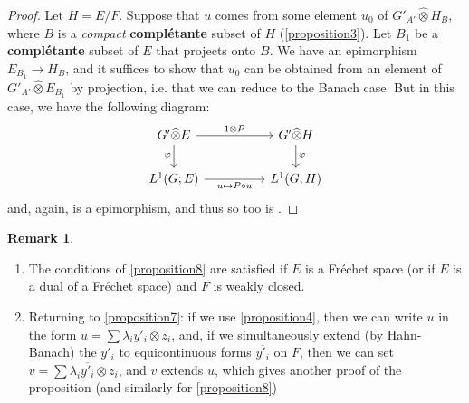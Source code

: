 \documentclass{article}
\theoremstyle{plain}
\theoremstyle{definition}
\newtheorem*{remark}{Remark}
\newcommand{\cotimes}{\widehat{\otimes}}
\newcommand{\oldpage}[1]{\marginpar{\footnotesize$\Big\vert$ \textit{p.~#1}}}
\begin{document}
\begin{proof}
  Let $H=E/F$.
  Suppose that $u$ comes from some element $u_0$ of $G'_{A'}\cotimes H_B$, where $B$ is a \emph{compact} \textbf{complétante} subset of $H$ (\cref{proposition3}).
  Let $B_1$ be a \textbf{complétante} subset of $E$ that projects onto $B$.
  We have an epimorphism $E_{B_1}\to H_B$, and it suffices to show that $u_0$ can be obtained from an element of $G'_{A'}\cotimes E_{B_1}$ by projection, i.e. that we can reduce to the Banach case.
  But in this case, we have the following diagram:
  \[
    \begin{tikzcd}[column sep=huge]
      G'\cotimes E \ar[r,"1\otimes P"] \ar[d,swap,"\varphi"]
      & G'\cotimes H \ar[d,"\varphi"]
    \\L^1(G;E) \ar[r,swap,"u\mapsto P\circ u"]
      & L^1(G;H)
    \end{tikzcd}
  \]
  and, again,  is a epimorphism, and thus so too is .
\end{proof}

\begin{remark}
  \begin{enumerate}
    \item The conditions of \cref{proposition8} are satisfied if $E$ is a Fréchet space (or if $E$ is a dual of a Fréchet space) and $F$ is weakly
\oldpage{7}
      closed.
    \item Returning to \cref{proposition7}: if we use \cref{proposition4}, then we can write $u$ in the form $u=\sum\lambda_i y'_i\otimes z_i$, and, if we simultaneously extend (by Hahn-Banach) the $y'_i$ to equicontinuous forms $\overline{y'_i}$ on $F$, then we can set $v=\sum\lambda_i\overline{y'_i}\otimes z_i$, and $v$ extends $u$, which gives another proof of the proposition (and similarly for \cref{proposition8})
  \end{enumerate}
\end{remark}
\end{document}
